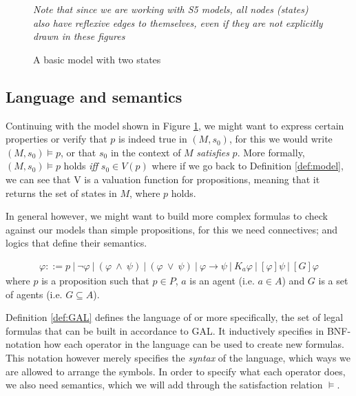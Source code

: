 \begin{figure}[h]
	\label{fig:basicEM}
	\caption{A basic model with two states}
	\centering
	\break \textit{Note that since we are working with S5 models, all nodes (states) also have reflexive edges to themselves, even if they are not explicitly drawn in these figures}
\end{figure}

\subsection{Language and semantics}

Continuing with the model shown in Figure \ref{fig:basicEM}, we might want to express certain properties or verify that $p$ is indeed true in $(M,s_0)$, for this we would write $(M,s_0) \models p$, or that $s_0$ in the context of $M$ \textit{satisfies} $p$. More formally, $(M,s_0) \models p$ holds \textit{iff} $s_0 \in V(p)$ where if we go back to Definition \ref{def:model}, we can see that V is a valuation function for propositions, meaning that it returns the set of states in $M$, where $p$ holds. 

In general however, we might want to build more complex formulas to check against our models than simple propositions, for this we need connectives; and logics that define their semantics.

\begin{definition} \hfill
	\label{def:GAL}
 	\begin{align*}
		\varphi ::= p \ | ~\neg\varphi ~|~ (\varphi~\wedge~\psi) ~|~ (\varphi~\vee~\psi) ~|~ \varphi 							
		\rightarrow \psi ~|~ K_a\varphi ~|~ [\varphi]\psi  ~|~ [G]\varphi
	\end{align*}
	where $p$ is a proposition such that $p \in P$, $a$ is an agent (i.e. $a \in A$) and $G$ is a set of agents (i.e. $G \subseteq A$).
\end{definition}

Definition \ref{def:GAL} defines the language of  or more specifically, the set of legal formulas that can be built in accordance to GAL. It inductively specifies in BNF-notation how each operator in the language can be used to create new formulas. This notation however merely specifies the \textit{syntax} of the language, which ways we are allowed to arrange the symbols. In order to specify what each operator does, we also need semantics, which we will add through the satisfaction relation $\models$.

